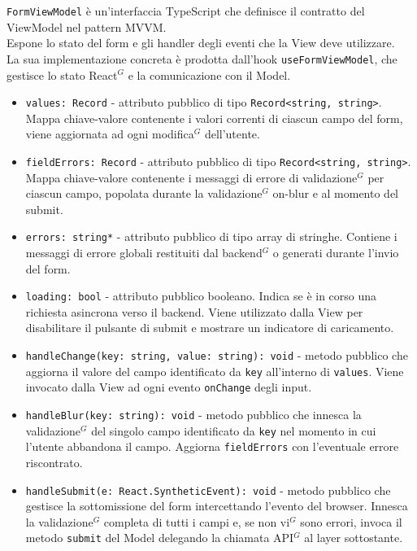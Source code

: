 \texttt{FormViewModel} è un'interfaccia TypeScript che definisce il contratto del ViewModel nel pattern MVVM.\\
Espone lo stato del form e gli handler degli eventi che la View deve utilizzare.\\
La sua implementazione concreta è prodotta dall'hook \texttt{useFormViewModel}, che gestisce lo stato React$^G$ e la comunicazione con il Model.

\begin{itemize}
	\item \texttt{values: Record} - attributo pubblico di tipo \texttt{Record<string, string>}.
	Mappa chiave-valore contenente i valori correnti di ciascun campo del form, viene aggiornata ad ogni modifica$^G$ dell'utente.

	\item \texttt{fieldErrors: Record} - attributo pubblico di tipo \texttt{Record<string, string>}.
	Mappa chiave-valore contenente i messaggi di errore di validazione$^G$ per ciascun campo, popolata durante la validazione$^G$ on-blur e al momento del submit.

	\item \texttt{errors: string*} - attributo pubblico di tipo array di stringhe.
	Contiene i messaggi di errore globali restituiti dal backend$^G$ o generati durante l'invio del form.

	\item \texttt{loading: bool} - attributo pubblico booleano.
	Indica se è in corso una richiesta asincrona verso il backend.
	Viene utilizzato dalla View per disabilitare il pulsante di submit e mostrare un indicatore di caricamento.
\end{itemize}

\begin{itemize}
	\item \texttt{handleChange(key: string, value: string): void} - metodo pubblico che aggiorna il valore del campo identificato da \texttt{key} all'interno di \texttt{values}.
	Viene invocato dalla View ad ogni evento \texttt{onChange} degli input.

	\item \texttt{handleBlur(key: string): void} - metodo pubblico che innesca la validazione$^G$ del singolo campo identificato da \texttt{key} nel momento in cui l'utente abbandona il campo.
	Aggiorna \texttt{fieldErrors} con l'eventuale errore riscontrato.

	\item \texttt{handleSubmit(e: React.SyntheticEvent): void} - metodo pubblico che gestisce la sottomissione del form intercettando l'evento del browser. Innesca la validazione$^G$ completa di tutti i campi e, se non vi$^G$ sono errori, invoca il metodo \texttt{submit} del Model delegando
	la chiamata API$^G$ al layer sottostante.
\end{itemize}


